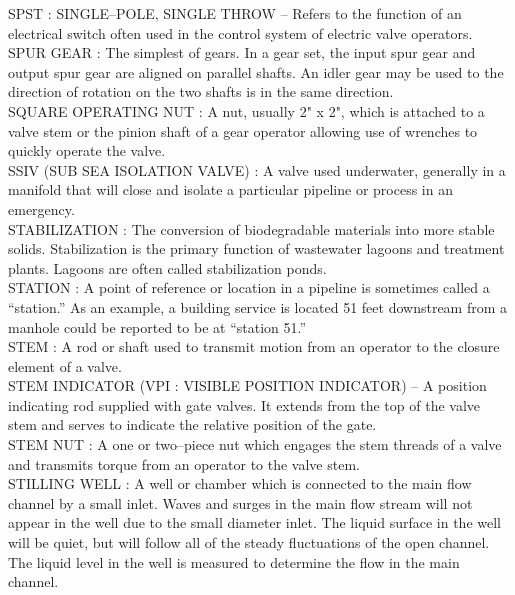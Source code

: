 \vspace{0.15cm}
SPST :  SINGLE–POLE, SINGLE THROW –  Refers to the function of an electrical switch often used in the control system of electric valve operators.\\
\vspace{0.15cm}
SPUR GEAR :   The simplest of gears. In a gear set, the input spur gear and output spur gear are aligned on parallel shafts. An idler gear may be used to the direction of rotation on the two shafts is in the same direction.\\
\vspace{0.15cm}
SQUARE OPERATING NUT :   A nut, usually 2" x 2", which is attached to a valve stem or the pinion shaft of a gear operator allowing use of wrenches to quickly operate the valve.\\
\vspace{0.15cm}
SSIV (SUB SEA ISOLATION VALVE) :   A valve used underwater, generally in a manifold that will close and isolate a particular pipeline or process in an emergency.\\
\vspace{0.15cm}
STABILIZATION :  The conversion of biodegradable materials into more stable solids. Stabilization is the primary function of wastewater lagoons and treatment plants. Lagoons are often called stabilization ponds.\\
\vspace{0.15cm}
STATION :  A point of reference or location in a pipeline is sometimes called a “station.” As an example, a building service is located 51 feet downstream from a manhole could be reported to be at “station 51.” \\
\vspace{0.15cm}
STEM :   A rod or shaft used to transmit motion from an operator to the closure element of a valve.\\
\vspace{0.15cm}
STEM INDICATOR (VPI :  VISIBLE POSITION INDICATOR) –  A position indicating rod supplied with gate valves. It extends from the top of the valve stem and serves to indicate the relative position of the gate.\\
\vspace{0.15cm}
STEM NUT :   A one or two–piece nut which engages the stem threads of a valve and transmits torque from an operator to the valve stem.\\
\vspace{0.15cm}
STILLING WELL :  A well or chamber which is connected to the main flow channel by a small inlet. Waves and surges in the main flow stream will not appear in the well due to the small diameter inlet. The liquid surface in the well will be quiet, but will follow all of the steady fluctuations of the open channel. The liquid level in the well is measured to determine the flow in the main channel. \\
